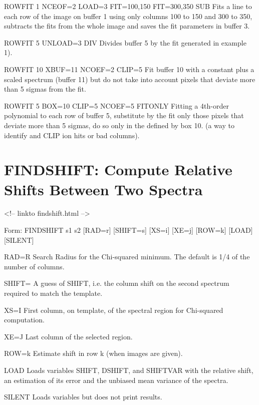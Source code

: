 \begin{example}
  \item[ROWFIT 1 NCEOF=2 LOAD=3 FIT=100,150 FIT=300,350 SUB \hfill]{ Fits a
       line to each row of the image on buffer 1 using only columns 100 to
       150 and 300 to 350, subtracts the fits from the whole image and
       saves the fit parameters in buffer 3.}

  \item[ROWFIT 5 UNLOAD=3 DIV\hfill]{ Divides buffer 5 by the fit generated
       in example 1).}

  \item[ROWFIT 10 XBUF=11 NCOEF=2 CLIP=5\hfill]{ Fit buffer 10 with a
       constant plus a scaled spectrum (buffer 11) but do not take into
       account pixels that deviate more than 5 sigmas from the fit.}

  \item[ROWFIT 5 BOX=10 CLIP=5 NCOEF=5 FITONLY\hfill]{ Fitting a 4th-order
       polynomial to each row of buffer 5, substitute by the fit only those
       pixels that deviate more than 5 sigmas, do so only in the defined by
       box 10. (a way to identify and CLIP ion hits or bad columns).}
\end{example}

\section{FINDSHIFT: Compute Relative Shifts Between Two Spectra}
\begin{rawhtml}
<!-- linkto findshift.html -->
\end{rawhtml}
\begin{command}
  \item[Form: FINDSHIFT s1 s2 {[RAD=r]} {[SHIFT=s]} {[XS=i]} {[XE=j]} 
       {[ROW=k]} {[LOAD]} {[SILENT]}\hfill]{}
  \item[RAD=R]{Search Radius for the Chi-squared minimum.
               The default is 1/4 of the number of columns.}
  \item[SHIFT=]{A guess of SHIFT, i.e. the column shift on the
                second spectrum required to match the template.}
  \item[XS=I]{First column, on template, of the spectral
              region for Chi-squared computation.}
  \item[XE=J]{Last column of the selected region.}
  \item[ROW=k]{Estimate shift in row k (when images are given).}
  \item[LOAD]{Loads variables SHIFT, DSHIFT, and SHIFTVAR with
              the relative shift, an estimation of its error
              and the unbiased mean variance of the spectra.}
  \item[SILENT]{Loads variables but does not print results.}
\end{command}

